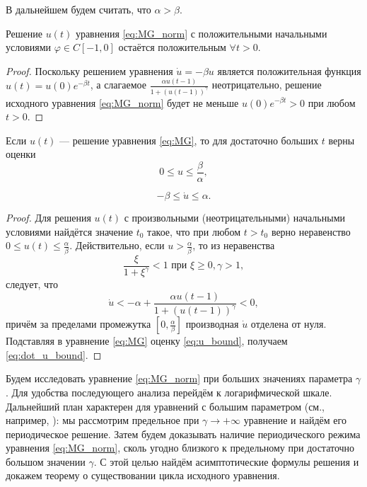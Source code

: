 В дальнейшем будем считать, что $\alpha > \beta$.

\begin{proposition}
Решение $u(t)$ уравнения \eqref{eq:MG_norm} с положительными начальными условиями $\varphi \in C[-1, 0]$ остаётся положительным $\forall t > 0$.
\end{proposition}
\begin{proof}
	Поскольку решением уравнения $\dot{u} = -\beta u$ является положительная функция $u(t) = u(0) e^{-\beta t}$, а слагаемое $\frac{\alpha u(t-1)}{1+(u(t-1))^\gamma}$ неотрицательно, решение исходного уравнения \eqref{eq:MG_norm} будет не меньше $u(0) e^{-\beta t} > 0$ при любом $t > 0$.
\end{proof}

\begin{proposition}
	\label{prop:boundness}
	Если $u(t)$ --- решение уравнения \eqref{eq:MG}, то для достаточно больших $t$ верны оценки
	\begin{equation}
		\label{eq:u_bound}
		0 \leq u \leq \frac{\beta}{\alpha},
	\end{equation}
	
	\begin{equation}
		\label{eq:dot_u_bound}
		-\beta \leq \dot{u} \leq \alpha.
	\end{equation}
\end{proposition}
\begin{proof}
	Для решения $u(t)$ с произвольными (неотрицательными) начальными условиями найдётся значение $t_0$ такое, что при любом $t > t_0$ верно неравенство $0 \leq u(t) \leq \frac{\alpha}{\beta}$. Действительно, если $u > \frac{\alpha}{\beta}$, то из неравенства
	\[
	\dfrac{\xi}{1 + \xi^{\gamma}} < 1 \text{ при } \xi \geq 0, \gamma > 1,
	\]
	следует, что
	\[\dot{u} < -\alpha + \frac{\alpha u(t - 1)}{1 + (u(t - 1))^{\gamma}} < 0,\]
	причём за пределами промежутка $[0, \frac{\alpha}{\beta}]$ производная $\dot{u}$ отделена от нуля. Подставляя в уравнение \eqref{eq:MG} оценку \eqref{eq:u_bound}, получаем \eqref{eq:dot_u_bound}.
\end{proof}

Будем исследовать уравнение \eqref{eq:MG_norm} при больших значениях параметра $\gamma$. Для удобства последующего анализа перейдём к логарифмической шкале. Дальнейший план характерен для уравнений с большим параметром (см., например, \cite{Kolesov2010}): мы рассмотрим предельное при $\gamma\to+\infty$ уравнение и найдём его периодическое решение. Затем будем доказывать наличие периодического режима уравнения \eqref{eq:MG_norm}, сколь угодно близкого к предельному при достаточно большом значении $\gamma$. С этой целью найдём асимптотические формулы решения и докажем теорему о существовании цикла исходного уравнения.

